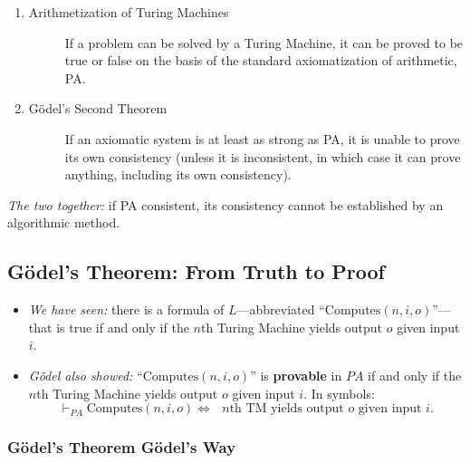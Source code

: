 \documentclass[12pt]{extarticle}
\begin{document}
\begin{enumerate}

\item  \begin{description}\item[Arithmetization of Turing Machines]
If a problem can be solved by a Turing Machine, it can be proved to be true or false on the basis of the standard axiomatization of arithmetic, PA.
\end{description}

\item \begin{description}
\item[G\"odel's Second Theorem]
If an axiomatic system is at least as strong as PA, it is unable to prove its own consistency (unless it is inconsistent, in which case it can prove anything, including its own consistency).

\end{description}


\end{enumerate}

\noindent
\emph{The two together:} if PA consistent, its consistency cannot be established by an algorithmic method.

\subsection{G\"odel's Theorem: From Truth to Proof}

\begin{itemize}

\item \emph{We have seen:} there is a formula of $L$---abbreviated ``$\text{Computes}(n,i,o)$''---that is true if and only if the $n$th Turing Machine yields output $o$ given input $i$.

\item \emph{G\"odel also showed:} ``$\text{Computes}(n,i,o)$'' is \textbf{provable} in $PA$ if and only if the $n$th Turing Machine yields output $o$ given input $i$. In symbols:
$$\vdash_{PA} \text{Computes}(n,i,o) \Leftrightarrow \text{ $n$th TM yields output $o$ given input $i$.}$$


\end{itemize}

\subsubsection*{G\"odel's Theorem G\"odel's Way}
\end{document}
